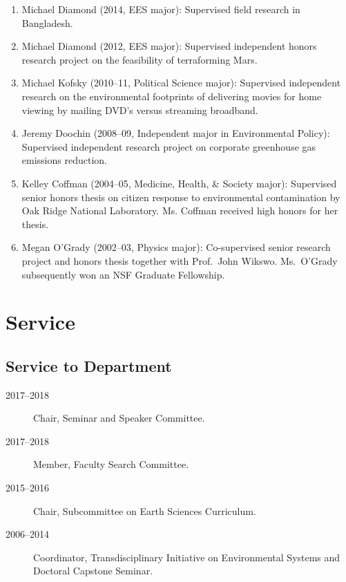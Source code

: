 \documentclass[10pt]{article}
\begin{document}
\begin{enumerate}
    \item Michael Diamond (2014, EES major): Supervised field research in Bangladesh.
    \item Michael Diamond (2012, EES major): Supervised independent honors research project on the feasibility of terraforming Mars.
    \item Michael Kofsky (2010--11, Political Science major): Supervised independent research on the environmental footprints of delivering movies for home viewing by mailing DVD's versus streaming broadband.
    \item Jeremy Doochin (2008--09, Independent major in Environmental Policy): Supervised independent research project on corporate greenhouse gas emissions reduction.
    \item Kelley Coffman (2004--05, Medicine, Health, \& Society major): Supervised senior honors thesis on citizen response to environmental contamination by Oak Ridge National Laboratory. Ms. Coffman received high honors for her thesis.
    \item Megan O'Grady (2002--03, Physics major): Co-supervised senior research project and honors thesis together with Prof.~John Wikswo. Ms.~O'Grady subsequently won an NSF Graduate Fellowship.
    \end{enumerate}
\fi

\section{Service}
\iftrue
    \subsection{Service to Department}
        \begin{description}
            \item[2017--2018] Chair, Seminar and Speaker Committee.
            \item[2017--2018] Member, Faculty Search Committee.
            \item[2015--2016] Chair, Subcommittee on Earth Sciences Curriculum.
            \item[2006--2014] Coordinator, Transdisciplinary Initiative on Environmental Systems and Doctoral Capstone Seminar.
        \end{description}
\end{document}
